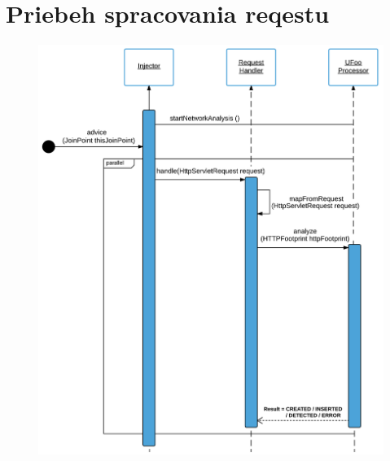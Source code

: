 \documentclass[
  printed, %
  table,   %
  lof,     %
  nolot,   %
  nocover
]{fithesis3}
\begin{document}
\chapter{Priebeh spracovania reqestu}
\label{fig:appendix-impl-flow}
\begin{figure}[H]
  \centering
    \includegraphics[width=1\textwidth]{images/footprint-impl-flow-1.png}
\end{figure}
\end{document}
